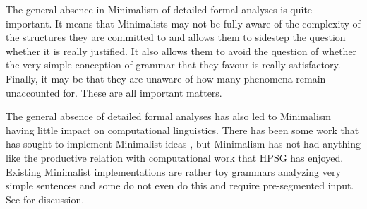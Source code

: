 \documentclass[output=paper]{langsci/langscibook}
\begin{document}
The general absence in Minimalism of detailed formal analyses is quite important. It means that Minimalists may not be fully aware of the complexity of the structures they are committed to and allows them to sidestep the question whether it is really justified. It also allows them to avoid the question of whether the very simple conception of grammar that they favour is really satisfactory. Finally, it may be that they are unaware of how many phenomena remain unaccounted for. These are all important matters. 

The general absence of detailed formal analyses has also led to Minimalism having little impact on
computational linguistics. There has been some work that has sought to implement Minimalist ideas
\citep{Stabler2001a,FG2012a,Fong2014a}, but Minimalism has not had anything like the productive
relation with computational work that HPSG has enjoyed. Existing Minimalist implementations are rather toy
grammars analyzing very simple sentences and some do not even do this and require pre-segmented
input. See \citet[Section~4.7.2]{MuellerGT-Eng1} for discussion.
\end{document}
